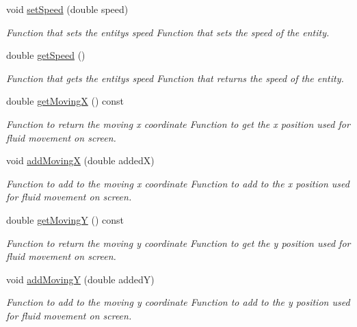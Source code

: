 \begin{DoxyCompactItemize}
void \hyperlink{classGameLogic_1_1Entity_ae0f16e2b996a2654851e757dfa255ba9}{set\+Speed} (double speed)
\begin{DoxyCompactList}\small\item\em Function that sets the entity\textquotesingle{}s speed Function that sets the speed of the entity. \end{DoxyCompactList}\item 
double \hyperlink{classGameLogic_1_1Entity_a7c0d8853692bccc978847b658d45fb5e}{get\+Speed} ()
\begin{DoxyCompactList}\small\item\em Function that gets the entity\textquotesingle{}s speed Function that returns the speed of the entity. \end{DoxyCompactList}\item 
double \hyperlink{classGameLogic_1_1Entity_a770b837c07c91f3fa72c755d6d77d153}{get\+MovingX} () const
\begin{DoxyCompactList}\small\item\em Function to return the moving x coordinate Function to get the x position used for fluid movement on screen. \end{DoxyCompactList}\item 
void \hyperlink{classGameLogic_1_1Entity_a0610847bac56b7ec45dff937f20c048b}{add\+MovingX} (double addedX)
\begin{DoxyCompactList}\small\item\em Function to add to the moving x coordinate Function to add to the x position used for fluid movement on screen. \end{DoxyCompactList}\item 
double \hyperlink{classGameLogic_1_1Entity_a5e10708660f91ce9a225c08ebbecf7fd}{get\+MovingY} () const
\begin{DoxyCompactList}\small\item\em Function to return the moving y coordinate Function to get the y position used for fluid movement on screen. \end{DoxyCompactList}\item 
void \hyperlink{classGameLogic_1_1Entity_ad46302e582b23b71e250f15c47f59ee0}{add\+MovingY} (double addedY)
\begin{DoxyCompactList}\small\item\em Function to add to the moving y coordinate Function to add to the y position used for fluid movement on screen. \end{DoxyCompactList}\item 

\end{DoxyCompactItemize}

